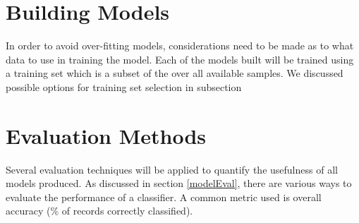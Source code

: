 \section{Building Models}
In order to avoid over-fitting models, considerations need to be made as to what data to use in training the model. Each of the models built will be trained using a training set which is a subset of the over all available samples. We discussed possible options for training set selection in subsection


\section{Evaluation Methods}
Several evaluation techniques will be applied to quantify the usefulness of all models produced. As discussed in section \ref{modelEval}, there are various ways to evaluate the performance of a classifier. A common metric used is overall accuracy (\% of records correctly classified). 

